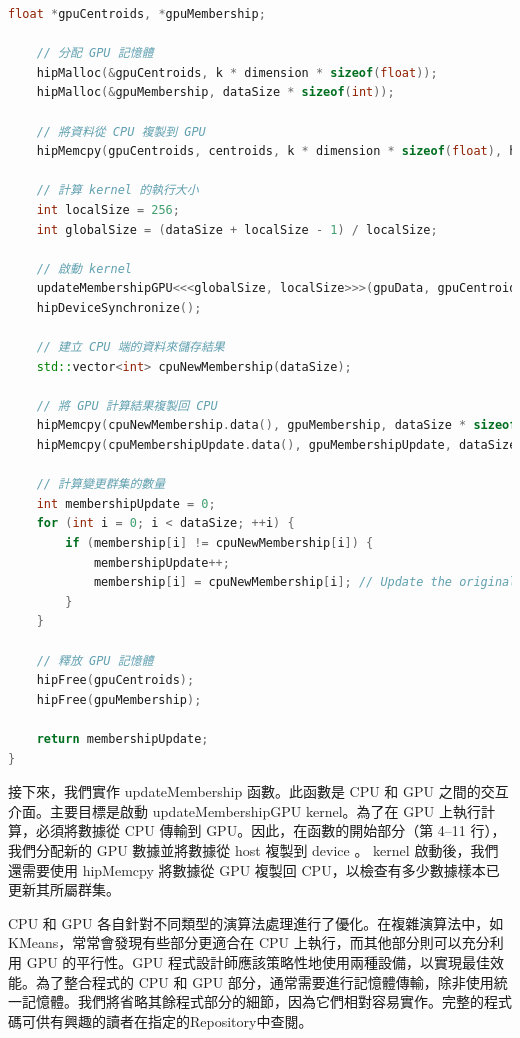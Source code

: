 {\begin{lstlisting}[language=c++,caption={ Listing 5.12：KMeans 的更新所屬群集函數，使用 GPU 加速計算}]
    float *gpuCentroids, *gpuMembership;

    // 分配 GPU 記憶體
    hipMalloc(&gpuCentroids, k * dimension * sizeof(float));
    hipMalloc(&gpuMembership, dataSize * sizeof(int));

    // 將資料從 CPU 複製到 GPU
    hipMemcpy(gpuCentroids, centroids, k * dimension * sizeof(float), hipMemcpyHostToDevice);

    // 計算 kernel 的執行大小
    int localSize = 256;
    int globalSize = (dataSize + localSize - 1) / localSize;

    // 啟動 kernel
    updateMembershipGPU<<<globalSize, localSize>>>(gpuData, gpuCentroids, gpuMembership, dataSize, dimension, k);
    hipDeviceSynchronize();

    // 建立 CPU 端的資料來儲存結果
    std::vector<int> cpuNewMembership(dataSize);

    // 將 GPU 計算結果複製回 CPU
    hipMemcpy(cpuNewMembership.data(), gpuMembership, dataSize * sizeof(int), hipMemcpyDeviceToHost);
    hipMemcpy(cpuMembershipUpdate.data(), gpuMembershipUpdate, dataSize * sizeof(float), hipMemcpyDeviceToHost);

    // 計算變更群集的數量
    int membershipUpdate = 0;
    for (int i = 0; i < dataSize; ++i) {
        if (membership[i] != cpuNewMembership[i]) {
            membershipUpdate++;
            membership[i] = cpuNewMembership[i]; // Update the original membership array
        }
    }

    // 釋放 GPU 記憶體
    hipFree(gpuCentroids);
    hipFree(gpuMembership);

    return membershipUpdate;
}
\end{lstlisting}


接下來，我們實作 updateMembership 函數。此函數是 CPU 和 GPU 之間的交互介面。主要目標是啟動 updateMembershipGPU kernel。為了在 GPU 上執行計算，必須將數據從 CPU 傳輸到 GPU。因此，在函數的開始部分（第 4–11 行），我們分配新的 GPU 數據並將數據從 host 複製到 device 。 kernel 啟動後，我們還需要使用 hipMemcpy 將數據從 GPU 複製回 CPU，以檢查有多少數據樣本已更新其所屬群集。


CPU 和 GPU 各自針對不同類型的演算法處理進行了優化。在複雜演算法中，如 KMeans，常常會發現有些部分更適合在 CPU 上執行，而其他部分則可以充分利用 GPU 的平行性。GPU 程式設計師應該策略性地使用兩種設備，以實現最佳效能。為了整合程式的 CPU 和 GPU 部分，通常需要進行記憶體傳輸，除非使用統一記憶體。我們將省略其餘程式部分的細節，因為它們相對容易實作。完整的程式碼可供有興趣的讀者在指定的Repository中查閱。

}

